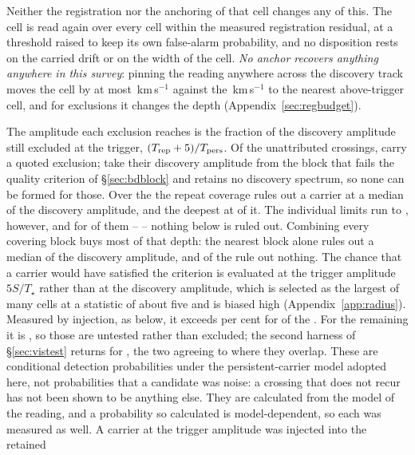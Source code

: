 Neither the registration nor the anchoring of that cell changes any of this.
The cell is read again over every cell within the measured registration
residual, at a threshold raised to keep its own false-alarm probability, and
no disposition rests on the carried drift or on the width of the cell.
\emph{No anchor recovers anything anywhere in this survey}: pinning the
reading anywhere across the discovery track moves the cell by at most
\AnSpanMaxKms\,km\,s$^{-1}$ against the \AnNearKms\,km\,s$^{-1}$ to the
nearest above-trigger cell, and for \AnNMeas{} exclusions it changes the depth
(Appendix~\ref{sec:regbudget}).

The amplitude each exclusion reaches is the fraction of the discovery
amplitude still excluded at the trigger, $(T_{\rm rep}+5)/T_{\rm pers}$. Of
the \RcNTested{} unattributed crossings, \RcNExcl{} carry a quoted exclusion;
\RcNWithheld{} take their discovery amplitude from the block that fails the
quality criterion of \S\ref{sec:bdblock} and \RcNNoSpec{} retains no discovery
spectrum, so none can be formed for those. Over the \RcNExcl{} the repeat coverage rules out a carrier at a median
\RcFracMed{} of the discovery amplitude, and the deepest at \RcFracMin{} of
it. The individual limits run to \RcFracMax, however, and for \RcNFracWeak{}
of them -- \RcFracWeakList{} -- nothing below \RcFracWeakLo{} is ruled out.
Combining every covering block buys most of that depth: the nearest block
alone rules out a median \TjFracNearMed{} of the discovery amplitude, and
\TjNNearWeak{} of the \RcNExcl{} rule out nothing. The chance that a carrier would have satisfied the criterion is
evaluated at the trigger amplitude $5S/T_\star$ rather than at the
discovery amplitude, which is selected as the largest of many cells at a
statistic of about five and is biased high (Appendix~\ref{app:radius}). Measured by injection, as below, it exceeds \RcPowerLevel{} per cent for
\HjNPowerHi{} of the \RcNExcl. For the remaining \HjNPowerLo{} it is
\HjLowList, so those are untested rather than excluded; the second harness of
\S\ref{sec:vistest} returns \RjMeasCp{} for \EvBStar, the two agreeing to
\HjCrossDev{} where they overlap. These are conditional detection probabilities
under the persistent-carrier model adopted here, not probabilities that a
candidate was noise: a crossing that does not recur has not been shown to be
anything else. They are calculated from the model of the reading, and a
probability so calculated is model-dependent, so each was measured as well.
A carrier at the trigger amplitude was injected into the retained
